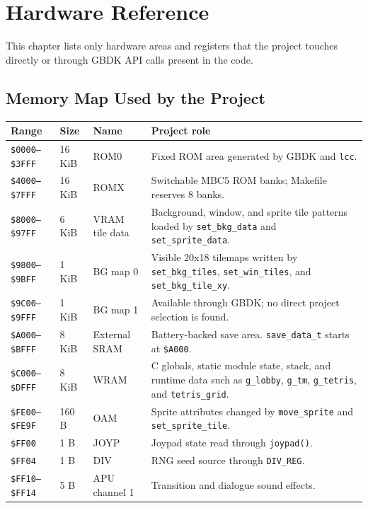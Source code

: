 \chapter{Hardware Reference}

This chapter lists only hardware areas and registers that the project touches directly or through GBDK API calls present in the code.

\section{Memory Map Used by the Project}

\begin{table}[h]
\centering
\small
\begin{tabular}{p{2.6cm}p{1.7cm}p{2.6cm}p{6.4cm}}
\toprule
\textbf{Range} & \textbf{Size} & \textbf{Name} & \textbf{Project role} \\
\midrule
\texttt{\$0000--\$3FFF} & 16 KiB & ROM0 & Fixed ROM area generated by GBDK and \texttt{lcc}. \\
\texttt{\$4000--\$7FFF} & 16 KiB & ROMX & Switchable MBC5 ROM banks; Makefile reserves 8 banks. \\
\texttt{\$8000--\$97FF} & 6 KiB & VRAM tile data & Background, window, and sprite tile patterns loaded by \texttt{set\_bkg\_data} and \texttt{set\_sprite\_data}. \\
\texttt{\$9800--\$9BFF} & 1 KiB & BG map 0 & Visible 20x18 tilemaps written by \texttt{set\_bkg\_tiles}, \texttt{set\_win\_tiles}, and \texttt{set\_bkg\_tile\_xy}. \\
\texttt{\$9C00--\$9FFF} & 1 KiB & BG map 1 & Available through GBDK; no direct project selection is found. \\
\texttt{\$A000--\$BFFF} & 8 KiB & External SRAM & Battery-backed save area. \texttt{save\_data\_t} starts at \texttt{\$A000}. \\
\texttt{\$C000--\$DFFF} & 8 KiB & WRAM & C globals, static module state, stack, and runtime data such as \texttt{g\_lobby}, \texttt{g\_tm}, \texttt{g\_tetris}, and \texttt{tetris\_grid}. \\
\texttt{\$FE00--\$FE9F} & 160 B & OAM & Sprite attributes changed by \texttt{move\_sprite} and \texttt{set\_sprite\_tile}. \\
\texttt{\$FF00} & 1 B & JOYP & Joypad state read through \texttt{joypad()}. \\
\texttt{\$FF04} & 1 B & DIV & RNG seed source through \texttt{DIV\_REG}. \\
\texttt{\$FF10--\$FF14} & 5 B & APU channel 1 & Transition and dialogue sound effects. \\

\end{tabular}
\end{table}
